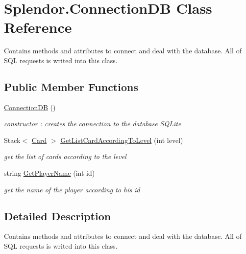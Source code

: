 \hypertarget{class_splendor_1_1_connection_d_b}{}\section{Splendor.\+Connection\+DB Class Reference}
\label{class_splendor_1_1_connection_d_b}


Contains methods and attributes to connect and deal with the database. All of S\+QL requests is writed into this class.  


\subsection*{Public Member Functions}
\begin{DoxyCompactItemize}
\item 
\mbox{\hyperlink{class_splendor_1_1_connection_d_b_aaaa5c66d4f12702d36a76dd21beb62c4}{Connection\+DB}} ()
\begin{DoxyCompactList}\small\item\em constructor \+: creates the connection to the database S\+Q\+Lite \end{DoxyCompactList}\item 
Stack$<$ \mbox{\hyperlink{class_splendor_1_1_card}{Card}} $>$ \mbox{\hyperlink{class_splendor_1_1_connection_d_b_abcd995d0fa97aa5f3a40ff5c23b22502}{Get\+List\+Card\+According\+To\+Level}} (int level)
\begin{DoxyCompactList}\small\item\em get the list of cards according to the level \end{DoxyCompactList}\item 
string \mbox{\hyperlink{class_splendor_1_1_connection_d_b_a7d715d5452049ad06f4a407fa5df151c}{Get\+Player\+Name}} (int id)
\begin{DoxyCompactList}\small\item\em get the name of the player according to his id \end{DoxyCompactList}\end{DoxyCompactItemize}


\subsection{Detailed Description}
Contains methods and attributes to connect and deal with the database. All of S\+QL requests is writed into this class. 



